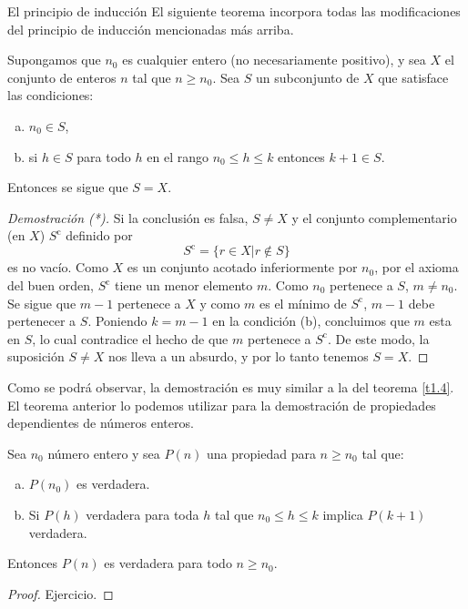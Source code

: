 \begin{section}{El principio de inducción}
El siguiente teorema incorpora todas las modificaciones del principio de inducción mencionadas más arriba.

\begin{teorema} Supongamos que $n_0$ es cualquier entero (no necesariamente positivo), y sea $X$
el conjunto de enteros $n$ tal que $ n \ge n_0$. Sea $S$ un subconjunto de $X$
que satisface las condiciones: 
\begin{enumerate}[a)]
\item $n_0 \in S$,
\item si $h\in S$ para todo $h$ en el rango $n_0 \le h \le k$ entonces $k+1 \in S$.
\end{enumerate}
Entonces se sigue que $S=X$.
\end{teorema}
\begin{proof}[Demostración (*)]
Si la conclusión es falsa, $S \not= X$ y
el conjunto complementario (en $X$)  $S^{\text{c}}$ definido por
$$
S^{\text{c}}= \{ r \in X | r\not\in S\}
$$
es no vacío. Como $X$ es un conjunto acotado inferiormente por $n_0$, por el axioma del buen orden, $S^{\text{c}}$ tiene un menor
elemento $m$. Como $n_0$ pertenece a $S$, $m\not=n_0$. Se sigue que
$m-1$ pertenece a $X$ y como $m$ es el mínimo de
$S^{\text{c}}$, $m-1$ debe pertenecer a $S$. Poniendo $k=m-1$ en
la condición (b), concluimos que $m$ esta en $S$, lo cual
contradice el hecho de que $m$ pertenece a $S^{\text{c}}$. De este
modo, la suposición $S \not= X$ nos lleva a un absurdo, y
por lo tanto tenemos $S= X$.
\end{proof}

Como se podrá observar, la demostración es muy similar a  la del teorema \ref{t1.4}. El teorema anterior lo podemos utilizar para la demostración de propiedades dependientes de números enteros.

\begin{teorema}\label{ind-completa} Sea $n_0$ número entero y sea $P(n)$ una propiedad para $n \ge n_0$ tal que:
\begin{enumerate}[a)]
\item $P(n_0)$ es verdadera.
\item Si $P(h)$ verdadera para toda $h$ tal que $n_0 \le h \le k$ implica $P(k + 1)$ verdadera.
\end{enumerate}
Entonces $P(n)$ es verdadera para todo $n \ge n_0$.
\end{teorema}
\begin{proof} Ejercicio.
\end{proof}




\end{section}
